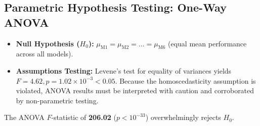 \documentclass[12pt,a4paper]{article}
\begin{document}
\subsection{Parametric Hypothesis Testing: One-Way ANOVA}
\begin{itemize}
    \item \textbf{Null Hypothesis ($H_0$):} $\mu_{\text{M1}} = \mu_{\text{M2}} = \dots = \mu_{\text{M6}}$ (equal mean performance across all models).
    \item \textbf{Assumptions Testing:} Levene's test for equality of variances yields $F = 4.62, p = 1.02 \times 10^{-3} < 0.05$. Because the homoscedasticity assumption is violated, ANOVA results must be interpreted with caution and corroborated by non-parametric testing.
\end{itemize}

\begin{table}[H]
\centering
\caption{One-Way ANOVA Summary Table}
\end{table}

The ANOVA $F$-statistic of \textbf{206.02} ($p < 10^{-33}$) overwhelmingly rejects $H_0$. 
\end{document}
